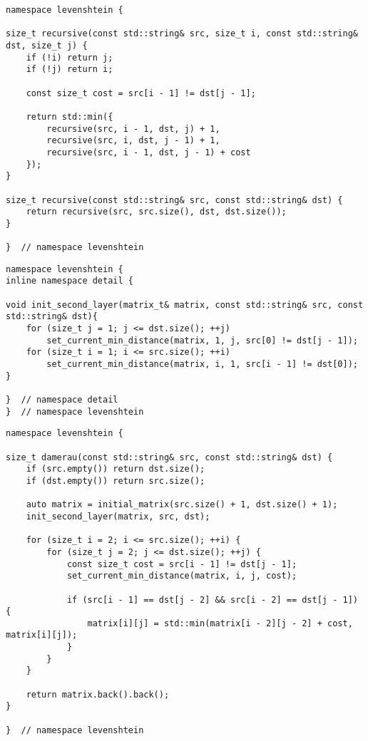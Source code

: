 \begin{lstlisting}[caption={Функция, реализующая рекурсивный алгоритм Левенштейна},label={lst:levenshtein_recursive},style={cpp}]
namespace levenshtein {

size_t recursive(const std::string& src, size_t i, const std::string& dst, size_t j) {
	if (!i) return j;
	if (!j) return i;

	const size_t cost = src[i - 1] != dst[j - 1];

	return std::min({
		recursive(src, i - 1, dst, j) + 1,
		recursive(src, i, dst, j - 1) + 1,
		recursive(src, i - 1, dst, j - 1) + cost
	});
}

size_t recursive(const std::string& src, const std::string& dst) {
	return recursive(src, src.size(), dst, dst.size());
}

}  // namespace levenshtein
\end{lstlisting}

\begin{lstlisting}[caption={Процедура, инициализирующая вторую строку и второй столбец},label={lst:init_second_layer},style={cpp}]
namespace levenshtein {
inline namespace detail {

void init_second_layer(matrix_t& matrix, const std::string& src, const std::string& dst){
	for (size_t j = 1; j <= dst.size(); ++j)
		set_current_min_distance(matrix, 1, j, src[0] != dst[j - 1]);
	for (size_t i = 1; i <= src.size(); ++i)
		set_current_min_distance(matrix, i, 1, src[i - 1] != dst[0]);
}

}  // namespace detail
}  // namespace levenshtein
\end{lstlisting}

\begin{lstlisting}[caption={Функция, реализующая алгоритм Дамерау — Левенштейна},label={lst:levenshtein_damerau},style={cpp}]
namespace levenshtein {

size_t damerau(const std::string& src, const std::string& dst) {
	if (src.empty()) return dst.size();
	if (dst.empty()) return src.size();

	auto matrix = initial_matrix(src.size() + 1, dst.size() + 1);
	init_second_layer(matrix, src, dst);

	for (size_t i = 2; i <= src.size(); ++i) {
		for (size_t j = 2; j <= dst.size(); ++j) {
			const size_t cost = src[i - 1] != dst[j - 1];
			set_current_min_distance(matrix, i, j, cost);

			if (src[i - 1] == dst[j - 2] && src[i - 2] == dst[j - 1]) {
				matrix[i][j] = std::min(matrix[i - 2][j - 2] + cost, matrix[i][j]);
			}
		}
	}

	return matrix.back().back();
}

}  // namespace levenshtein
\end{lstlisting}

